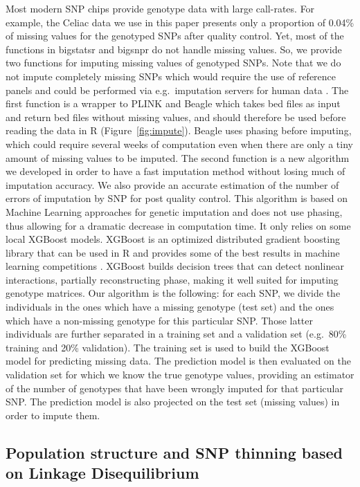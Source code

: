 \documentclass{bioinfo}
\begin{document}
\begin{methods}
{Most modern SNP chips provide genotype data with large call-rates. For example, the Celiac data we use in this paper presents only a proportion of 0.04\% of missing values for the genotyped SNPs after quality control. Yet, most of the functions in bigstatsr and bigsnpr do not handle missing values.
So, we provide two functions for imputing missing values of genotyped SNPs. Note that we do not impute completely missing SNPs which would require the use of reference panels and could be performed via e.g.\ imputation servers for human data \cite[]{mccarthy2016reference}. The first function is a wrapper to PLINK and Beagle \cite[]{Browning2009} which takes bed files as input and return bed files without missing values, and should therefore be used before reading the data in R (Figure~\ref{fig:impute}). Beagle uses phasing before imputing, which could require several weeks of computation even when there are only a tiny amount of missing values to be imputed. The second function is a new algorithm we developed in order to have a fast imputation method without losing much of imputation accuracy. We also provide an accurate estimation of the number of errors of imputation by SNP for post quality control.
This algorithm is based on Machine Learning approaches for genetic imputation \cite[]{Wang2012} and does not use phasing, thus allowing for a dramatic decrease in computation time. It only relies on some local XGBoost models. XGBoost is an optimized distributed gradient boosting library that can be used in R and provides some of the best results in machine learning competitions \cite[]{Chen2016}.
XGBoost builds decision trees that can detect nonlinear interactions, partially reconstructing phase, making it well suited for imputing genotype matrices. 
Our algorithm is the following: for each SNP, we divide the individuals in the ones which have a missing genotype (test set) and the ones which have a non-missing genotype for this particular SNP. Those latter individuals are further separated in a training set and a validation set (e.g.\ 80\% training and 20\% validation). The training set is used to build the XGBoost model for predicting missing data. The prediction model is then evaluated on the validation set for which we know the true genotype values, providing an estimator of the number of genotypes that have been wrongly imputed for that particular SNP. The prediction model is also projected on the test set (missing values) in order to impute them.
}



\subsection{Population structure and SNP thinning based on Linkage Disequilibrium} 




\end{methods}
\end{document}
